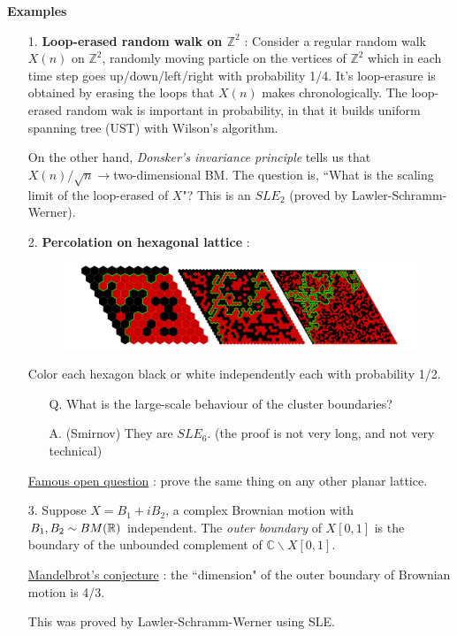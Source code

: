 \documentclass[12pt,a4paper]{article}
\begin{document}
\textbf{Examples}
\begin{itemize}
\item[1.] \textbf{Loop-erased random walk on $\mathbb{Z}^2$} : Consider a regular random walk $X(n)$ on $\mathbb{Z}^2$, randomly moving particle on the vertices of $\mathbb{Z}^2$ which in each time step goes up/down/left/right with probability 1/4. It's loop-erasure is obtained by erasing the loops that $X(n)$ makes chronologically. The loop-erased random wak is important in probability, in that it builds uniform spanning tree (UST) with Wilson's algorithm.

On the other hand, \emph{Donsker's invariance principle} tells us that $X(n)/\sqrt{n} \rightarrow$two-dimensional BM. The question is, ``What is the scaling limit of the loop-erased of $X$"? This is an $SLE_2$ (proved by Lawler-Schramm-Werner).
\item[2.] \textbf{Percolation on hexagonal lattice} :
\begin{figure}[h]
\begin{center}
    \includegraphics[scale =0.15]{1}
\end{center}
\end{figure}
 Color each hexagon black or white independently each with probability 1/2.
\begin{itemize}
\item[Q.] What is the large-scale behaviour of the cluster boundaries?
\item[A.] (Smirnov) They are $SLE_6$. (the proof is not very long, and not very technical)
\end{itemize}
\underline{Famous open question} : prove the same thing on any other planar lattice.
\item[3.] Suppose $X = B_1 + iB_2$, a complex Brownian motion with $B_1, B_2 \sim BM(\mathbb{R})$ independent. The \emph{outer boundary} of $X[0,1]$ is the boundary of the unbounded complement of $\mathbb{C} \backslash X[0,1]$.

\underline{Mandelbrot's conjecture} : the ``dimension" of the outer boundary of Brownian motion is 4/3.

This was proved by Lawler-Schramm-Werner using SLE.
\end{itemize}
\end{document}
